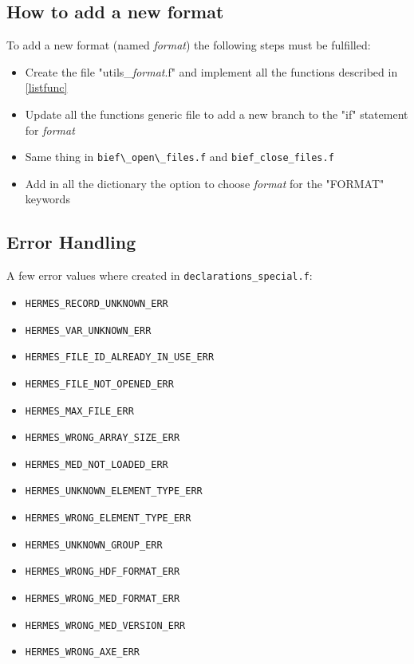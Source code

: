 \subsection{How to add a new format}
%
To add a new format (named \textit{format}) the following steps must be fulfilled:
\begin{itemize}
\item Create the file "utils\_\textit{format}.f" and implement all the functions
described in \ref{listfunc}
\item Update all the functions generic file to add a new branch to the "if"
statement for \textit{format}
\item Same thing in \verb!bief\_open\_files.f! and \verb!bief_close_files.f!
\item Add in all the dictionary the option to choose \textit{format} for the
"FORMAT" keywords
\end{itemize}

%
\subsection{Error Handling}
%
A few error values where created in \verb!declarations_special.f!:
\begin{itemize}
\item \verb!HERMES_RECORD_UNKNOWN_ERR!
\item \verb!HERMES_VAR_UNKNOWN_ERR!
\item \verb!HERMES_FILE_ID_ALREADY_IN_USE_ERR!
\item \verb!HERMES_FILE_NOT_OPENED_ERR!
\item \verb!HERMES_MAX_FILE_ERR!
\item \verb!HERMES_WRONG_ARRAY_SIZE_ERR!
\item \verb!HERMES_MED_NOT_LOADED_ERR!
\item \verb!HERMES_UNKNOWN_ELEMENT_TYPE_ERR!
\item \verb!HERMES_WRONG_ELEMENT_TYPE_ERR!
\item \verb!HERMES_UNKNOWN_GROUP_ERR!
\item \verb!HERMES_WRONG_HDF_FORMAT_ERR!
\item \verb!HERMES_WRONG_MED_FORMAT_ERR!
\item \verb!HERMES_WRONG_MED_VERSION_ERR!
\item \verb!HERMES_WRONG_AXE_ERR!
\end{itemize}


